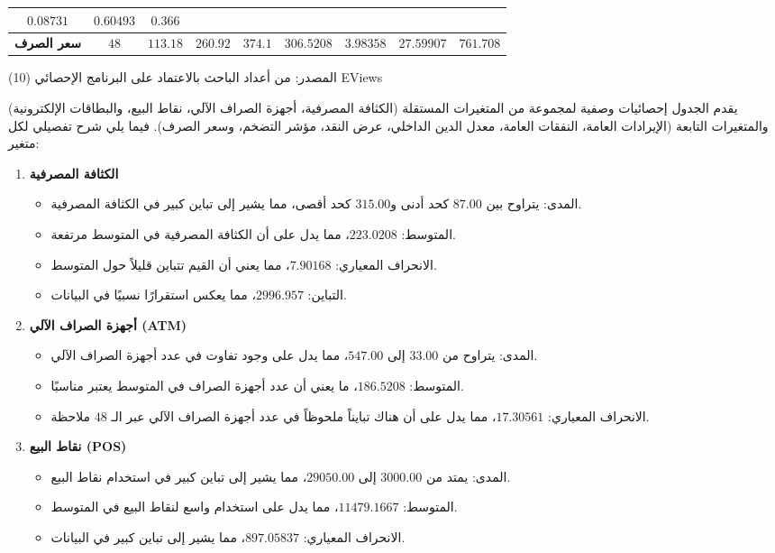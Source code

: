 \documentclass[10pt,a4paper]{report}
\begin{document}
\begin{doublespacing}
\begin{table}[H]
{\begin{tabular}{@{}|ccccccccc|@{}}
				\multicolumn{1}{c|}{$0.08731$} &
				\multicolumn{1}{c|}{$0.60493$} &
				$0.366$ \\ \midrule
				\multicolumn{1}{|c|}{\textbf{سعر الصرف}} &
				\multicolumn{1}{c|}{$48$} &
				\multicolumn{1}{c|}{$113.18$} &
				\multicolumn{1}{c|}{$260.92$} &
				\multicolumn{1}{c|}{$374.1$} &
				\multicolumn{1}{c|}{$306.5208$} &
				\multicolumn{1}{c|}{$3.98358$} &
				\multicolumn{1}{c|}{$27.59907$} &
				$761.708$ \\ \bottomrule
			\end{tabular}
		}
	\end{table}
المصدر: من أعداد الباحث بالاعتماد على البرنامج الإحصائي (10) EViews

يقدم الجدول إحصائيات وصفية لمجموعة من المتغيرات المستقلة (الكثافة المصرفية، أجهزة الصراف الآلي، نقاط البيع، والبطاقات الإلكترونية) والمتغيرات التابعة (الإيرادات العامة، النفقات العامة، معدل الدين الداخلي، عرض النقد، مؤشر التضخم، وسعر الصرف). فيما يلي شرح تفصيلي لكل متغير:
\begin{enumerate}
	\item \textbf{الكثافة المصرفية}
	\begin{itemize}
		\item المدى: يتراوح بين $87.00$ كحد أدنى و$315.00$ كحد أقصى، مما يشير إلى تباين كبير في الكثافة المصرفية.
		\item المتوسط: $223.0208$، مما يدل على أن الكثافة المصرفية في المتوسط مرتفعة.
		\item الانحراف المعياري: $7.90168$، مما يعني أن القيم تتباين قليلاً حول المتوسط.
		\item التباين: $2996.957$، مما يعكس استقرارًا نسبيًا في البيانات.
	\end{itemize}
	
	\item \textbf{أجهزة الصراف الآلي (ATM)}
	\begin{itemize}
		\item المدى: يتراوح من $33.00$ إلى $547.00$، مما يدل على وجود تفاوت في عدد أجهزة الصراف الآلي.
		\item المتوسط: $186.5208$، ما يعني أن عدد أجهزة الصراف في المتوسط يعتبر مناسبًا.
		\item الانحراف المعياري: $17.30561$، مما يدل على أن هناك تبايناً ملحوظاً في عدد أجهزة الصراف الآلي عبر الـ $48$ ملاحظة.
	\end{itemize}
	
	\item \textbf{نقاط البيع (POS)}
	\begin{itemize}
		\item المدى: يمتد من $3000.00$ إلى $29050.00$، مما يشير إلى تباين كبير في استخدام نقاط البيع.
		\item المتوسط: $11479.1667$، مما يدل على استخدام واسع لنقاط البيع في المتوسط.
		\item الانحراف المعياري: $897.05837$، مما يشير إلى تباين كبير في البيانات.
	\end{itemize}
	

\end{enumerate}
\end{doublespacing}
\end{document}
